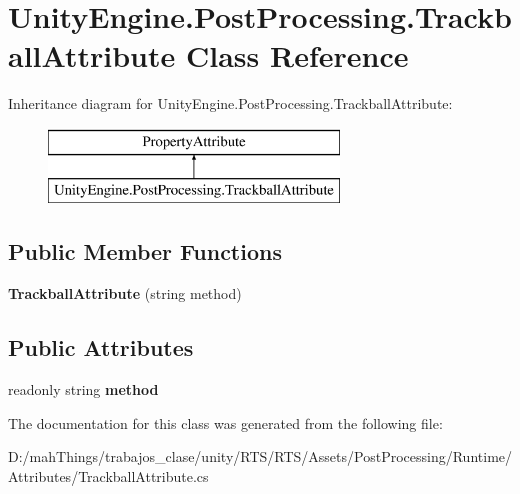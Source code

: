 \hypertarget{class_unity_engine_1_1_post_processing_1_1_trackball_attribute}{}\section{Unity\+Engine.\+Post\+Processing.\+Trackball\+Attribute Class Reference}
\label{class_unity_engine_1_1_post_processing_1_1_trackball_attribute}
Inheritance diagram for Unity\+Engine.\+Post\+Processing.\+Trackball\+Attribute\+:\begin{figure}[H]
\begin{center}
\leavevmode
\includegraphics[height=2.000000cm]{class_unity_engine_1_1_post_processing_1_1_trackball_attribute}
\end{center}
\end{figure}
\subsection*{Public Member Functions}
\begin{DoxyCompactItemize}
\item 
\mbox{\label{class_unity_engine_1_1_post_processing_1_1_trackball_attribute_a52191c242795edb5e0a72fabaa9e5978}} 
{\bfseries Trackball\+Attribute} (string method)
\end{DoxyCompactItemize}
\subsection*{Public Attributes}
\begin{DoxyCompactItemize}
\item 
\mbox{\label{class_unity_engine_1_1_post_processing_1_1_trackball_attribute_a221e0ff9fe5396c91114a43ee8314616}} 
readonly string {\bfseries method}
\end{DoxyCompactItemize}


The documentation for this class was generated from the following file\+:\begin{DoxyCompactItemize}
\item 
D\+:/mah\+Things/trabajos\+\_\+clase/unity/\+R\+T\+S/\+R\+T\+S/\+Assets/\+Post\+Processing/\+Runtime/\+Attributes/Trackball\+Attribute.\+cs\end{DoxyCompactItemize}
